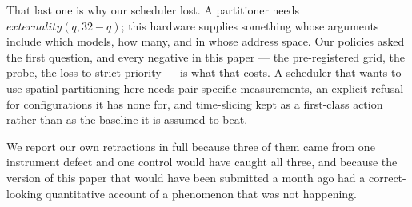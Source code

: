 \documentclass[sigconf,nonacm]{acmart}
\begin{document}
That last one is why our scheduler lost. A partitioner needs
$\mathit{externality}(q, 32-q)$; this hardware supplies something whose
arguments include which models, how many, and in whose address space. Our
policies asked the first question, and every negative in this paper ---
the pre-registered grid, the probe, the loss to strict priority --- is
what that costs. A scheduler that wants to use spatial partitioning here
needs pair-specific measurements, an explicit refusal for configurations
it has none for, and time-slicing kept as a first-class action rather
than as the baseline it is assumed to beat.

We report our own retractions in full because three of them came from one
instrument defect and one control would have caught all three, and
because the version of this paper that would have been submitted a month
ago had a correct-looking quantitative account of a phenomenon that was
not happening.
\end{document}
